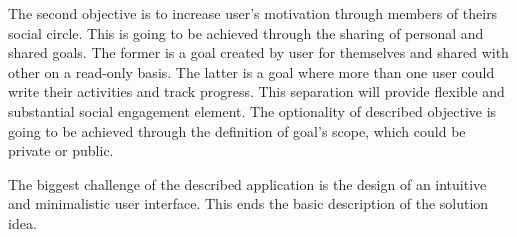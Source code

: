 The second objective is to increase user's motivation through members of theirs social circle.
This is going to be achieved through the sharing of personal and shared goals.
The former is a goal created by user for themselves and shared with other on a read-only basis.
The latter is a goal where more than one user could write their activities and track progress.
This separation will provide flexible and substantial social engagement element.
The optionality of described objective is going to be achieved through the definition of goal's scope, which could be private or public.

The biggest challenge of the described application is the design of an intuitive and minimalistic user interface.
This ends the basic description of the solution idea.
